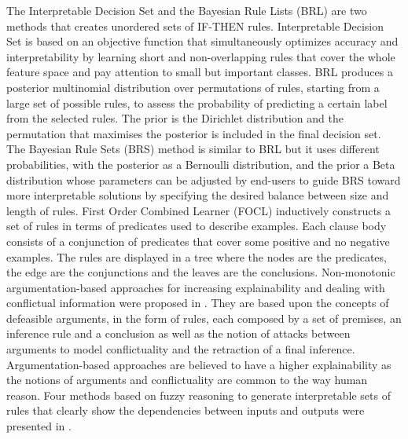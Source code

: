 \documentclass[final,1p,times]{elsarticle}
\begin{document}
The Interpretable Decision Set \cite{lakkaraju2016interpretable} and the Bayesian Rule Lists (BRL) \cite{letham2012building,letham2013interpretable,letham2015interpretable} are two methods that creates unordered sets of IF-THEN rules. Interpretable Decision Set is based on an objective function that simultaneously optimizes accuracy and interpretability by learning short and non-overlapping rules that cover the whole feature space and pay attention to small but important classes. BRL produces a posterior multinomial distribution over permutations of rules, starting from a large set of possible rules, to assess the probability of predicting a certain label from the selected rules. The prior is the Dirichlet distribution and the permutation that maximises the posterior is included in the final decision set. The Bayesian Rule Sets (BRS) method \cite{wang2016bayesian,wang2017bayesian} is similar to BRL but it uses different probabilities, with the posterior as a Bernoulli distribution, and the prior a Beta distribution whose parameters can be adjusted by end-users to guide BRS toward more interpretable solutions by specifying the desired balance between size and length of rules.
First Order Combined Learner (FOCL) \cite{pazzani1997comprehensible} inductively constructs a set of rules in terms of predicates used to describe examples. Each clause body consists of a conjunction of predicates that cover some positive and no negative examples. The rules are displayed in a tree where the nodes are the predicates, the edge are the conjunctions and the leaves are the conclusions.
Non-monotonic argumentation-based approaches for increasing explainability and dealing with conflictual information were proposed in \cite{rizzo2019inferential,rizzo2018qualitative, zeng2018building}.
They are based upon the concepts of defeasible arguments, in the form of rules, each composed by a set of premises, an inference rule and a conclusion as well as the notion of attacks between arguments to model conflictuality and the retraction of a final inference. Argumentation-based approaches are believed to have a higher explainability as the notions of arguments and conflictuality are common to the way human reason.
Four methods based on fuzzy reasoning to generate interpretable sets of rules that clearly show the dependencies between inputs and outputs were presented in \cite{ishibuchi2007analysis, jin2000fuzzy,pierrard2018learning, wang2011building}. 
\end{document}

